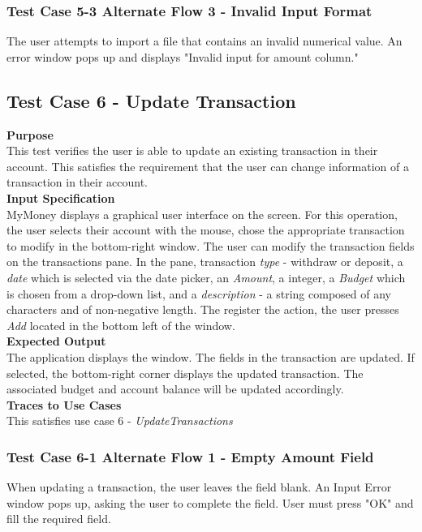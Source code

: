 \documentclass[12pt]{article}
\begin{document}
\subsubsection
{Test Case 5-3 Alternate Flow 3 - Invalid Input Format}
The user attempts to import a file that contains an invalid numerical value.
An error window pops up and displays "Invalid input for amount column."

\clearpage

\subsection{Test Case 6 - Update Transaction} \label{TC-6}
\noindent
{\bf Purpose}\\
This test verifies the user is able to update an existing transaction in their account.
This satisfies the requirement that the user can change information of a transaction in their account.\\
                                                    
\noindent
{\bf Input Specification}\\
MyMoney displays a graphical user interface on the screen.
For this operation, the user selects their account with the mouse,
chose the appropriate transaction to modify in the bottom-right window.
The user can modify the transaction fields on the transactions pane.
In the pane, transaction \textit{type} - withdraw or deposit, a \textit{date}
which is selected via the date picker, an \textit{Amount}, a integer, a \textit{Budget} which is chosen
from a drop-down list, and a \textit{description} - a string composed of any characters and
of non-negative length. The register the action, the user presses \textit{Add} located in the bottom left
of the window. \\
                                                    
\noindent
{\bf Expected Output}\\
The application displays the window.    
The fields in the transaction are updated.
If selected, the bottom-right corner displays the updated transaction. The associated budget and account balance will be updated accordingly.\\

\noindent
    {\bf Traces to Use Cases}\\
    This satisfies use case 6 - \textit{UpdateTransactions}\\
    
\subsubsection
{Test Case 6-1 Alternate Flow 1 - Empty Amount Field}
When updating a transaction, the user leaves the field blank.
An Input Error window pops up, asking the user to complete the field. User must press "OK" and fill the required field.
\end{document}
